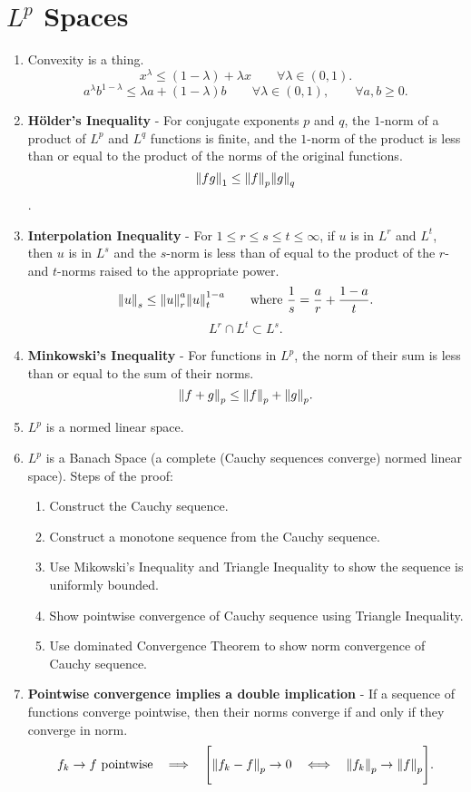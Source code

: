 \documentclass{article}
\begin{document}
    \section{$L^p$ Spaces}
    \begin{enumerate}
        \item Convexity is a thing.  $$x^\lambda \leq (1 - \lambda) + \lambda x \qquad \forall \lambda \in (0,1).$$ $$a^\lambda b^{1-\lambda} \leq \lambda a + (1 - \lambda)b \qquad \forall \lambda \in (0,1), \qquad \forall a,b \geq 0.$$
        \item \textbf{H\"{o}lder's Inequality} - For conjugate exponents $p$ and $q$, the $1$-norm of a product of $L^p$ and $L^q$ functions is finite, and the $1$-norm of the product is less than or equal to the product of the norms of the original functions.  $$\norm{fg}_1 \leq \norm{f}_p\norm{g}_q$$.
        \item \textbf{Interpolation Inequality} - For $1 \leq r \leq s \leq t \leq \infty$, if $u$ is in $L^r$ and $L^t$, then $u$ is in $L^s$ and the $s$-norm is less than of equal to the product of the $r$- and $t$-norms raised to the appropriate power. $$\norm{u}_s \leq \norm{u}_r^a \norm{u}_t^{1-a}\qquad \text{where } \frac{1}{s} = \frac{a}{r} + \frac{1-a}{t}.$$ $$L^r \cap L^t \subset L^s.$$
        \item \textbf{Minkowski's Inequality} - For functions in $L^p$, the norm of their sum is less than or equal to the sum of their norms. $$\norm{f + g}_p \leq \norm{f}_p + \norm{g}_p.$$
        \item $L^p$ is a normed linear space.
        \item $L^p$ is a Banach Space (a complete (Cauchy sequences converge) normed linear space).  Steps of the proof:
        \begin{enumerate}
            \item Construct the Cauchy sequence.
            \item Construct a monotone sequence from the Cauchy sequence.
            \item Use Mikowski's Inequality and Triangle Inequality to  show the sequence is uniformly bounded.
            \item Show pointwise convergence of Cauchy sequence using Triangle Inequality.
            \item Use dominated Convergence Theorem to show norm convergence of Cauchy sequence.
        \end{enumerate}
        \item \textbf{Pointwise convergence implies a double implication} - If a sequence of functions converge pointwise, then their norms converge if and only if they converge in norm. $$f_k \rightarrow f \text{ pointwise}\ \ \implies\ \ \Bigg[\norm{f_k - f}_p \rightarrow 0\ \ \iff\ \ \norm{f_k}_p \rightarrow \norm{f}_p\Bigg].$$

\end{enumerate}
\end{document}
